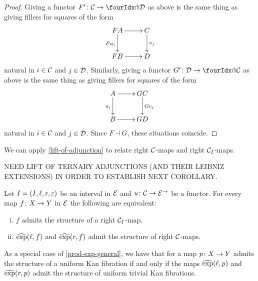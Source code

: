 \documentclass[reqno,10pt,a4paper,oneside]{amsart}
\begin{document}
\begin{proof} Giving a functor $F' \co \cal{C} \to \liftl{\cal{D}}$ as above is the same thing as giving fillers for squares of the form
\[
\xymatrix{
FA \ar[d]_{F u_i} \ar[r] & C \ar[d]^{v_j} \\
FB \ar[r] & D }
\]
natural in $i  \in \cal{C}$ and $j \in \cal{D}$. Similarly, giving a functor $G' \co \cal{D} \to \liftl{\cal{C}}$ as above is the same thing as giving fillers for squares 
of the form
\[
\xymatrix{
A \ar[d]_{u_i} \ar[r] & GC \ar[d]^{Gv_j} \\
B \ar[r] & GD }
\]
 natural in $i \in \cal{C}$ and $j \in \cal{D}$. Since $F \dashv G$, these situations coincide.
\end{proof}

We can apply \cref{lift-of-adjunction} to relate right $\cal{C}$-maps and 
right  $\cal{C}_\interval$-maps.

NEED LIFT OF TERNARY ADJUNCTIONS (AND THEIR LEIBNIZ EXTENSIONS) IN ORDER TO ESTABLISH NEXT COROLLARY.



\begin{corollary} \label{prod-exp-general}
Let $\interval = (\interval, \intervall, \intervalr, \varepsilon)$ be an interval in $\catE$ and
 $u \co \cal{C} \to \catE^\to$ be a functor. For every map $f \co X \to Y$ in $\cal{E}$ 
 the following are equivalent: 
\begin{enumerate}[(i)]
\item $f$ admits the structure of a right $\cal{C}_\interval$-map. 
\item $\hatexp(\intervall, f)$ and $\hatexp(\intervalr, f)$ admit the structure of right $\cal{C}$-maps.
\end{enumerate} 
\end{corollary}


 As a special case of \cref{prod-exp-general}, we have
that for a map $p \co X \to Y$ admits the structure of a uniform Kan fibration 
if and only if 
 the maps $\hatexp(\intervall, p)$ and $\hatexp(\intervalr, p)$ admit the structure of
uniform trivial Kan fibrations. 
\end{document}
